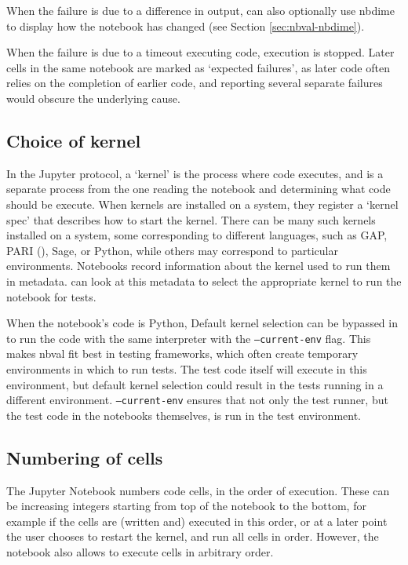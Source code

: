 \documentclass{deliverablereport}
\begin{document}
When the failure is due to a difference in output,
\nbval can also optionally use nbdime to display how the notebook has changed
(see Section \ref{sec:nbval-nbdime}).

When the failure is due to a timeout executing code, execution is stopped.
Later cells in the same notebook are marked as `expected failures',
as later code often relies on the completion of earlier code,
and reporting several separate failures would obscure the underlying cause.


\subsection{Choice of kernel}

In the Jupyter protocol, a `kernel' is the process where code executes,
and is a separate process from the one reading the notebook and determining what code should be execute.
When kernels are installed on a system,
they register a `kernel spec' that describes how to start the kernel.
There can be many such kernels installed on a system,
some corresponding to different languages, such as GAP, PARI (), Sage, or Python,
while others may correspond to particular environments.
Notebooks record information about the kernel used to run them in metadata.
\nbval can look at this metadata to select the appropriate kernel to run the notebook for tests.

When the notebook's code is Python,
Default kernel selection can be bypassed in \nbval to run the code with the same interpreter
with the \texttt{--current-env} flag.
This makes nbval fit best in testing frameworks,
which often create temporary environments in which to run tests.
The test code itself will execute in this environment,
but default kernel selection could result in the tests running in a different environment.
\texttt{--current-env} ensures that not only the test runner,
but the test code in the notebooks themselves,
is run in the test environment.


\subsection{Numbering of cells}

The Jupyter Notebook numbers code cells, in the order of
execution. These can be increasing integers starting from top of the
notebook to the bottom, for example if the cells are (written and)
executed in this order, or at a later point the user chooses to
restart the kernel, and run all cells in order. However, the notebook
also allows to execute cells in arbitrary order.
\end{document}
